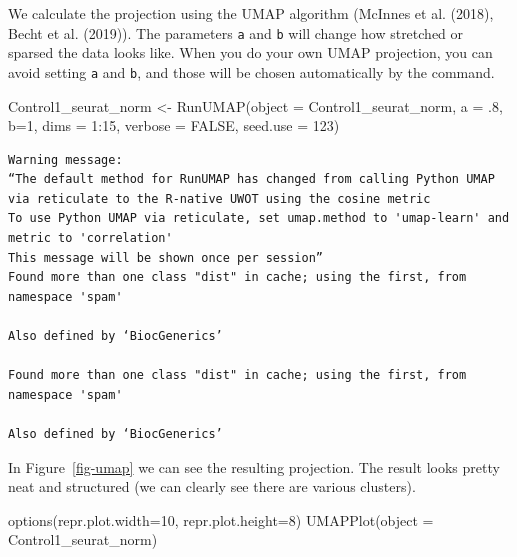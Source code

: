\documentclass[
  letterpaper,
  DIV=11,
  numbers=noendperiod]{scrartcl}
\newenvironment{Shaded}{\begin{snugshade}}{\end{snugshade}}
\newcommand{\AttributeTok}[1]{\textcolor[rgb]{0.49,0.56,0.16}{#1}}
\newcommand{\ConstantTok}[1]{\textcolor[rgb]{0.53,0.00,0.00}{#1}}
\newcommand{\DecValTok}[1]{\textcolor[rgb]{0.25,0.63,0.44}{#1}}
\newcommand{\FunctionTok}[1]{\textcolor[rgb]{0.02,0.16,0.49}{#1}}
\newcommand{\NormalTok}[1]{\textcolor[rgb]{0.00,0.44,0.13}{#1}}
\newcommand{\OtherTok}[1]{\textcolor[rgb]{0.00,0.44,0.13}{#1}}
\newcommand{\SpecialCharTok}[1]{\textcolor[rgb]{0.25,0.44,0.63}{#1}}
\begin{document}
We calculate the projection using the UMAP algorithm (McInnes et al.
(2018), Becht et al. (2019)). The parameters \texttt{a} and \texttt{b}
will change how stretched or sparsed the data looks like. When you do
your own UMAP projection, you can avoid setting \texttt{a} and
\texttt{b}, and those will be chosen automatically by the command.

\begin{Shaded}
\begin{Highlighting}[]
\NormalTok{Control1\_seurat\_norm }\OtherTok{\textless{}{-}} \FunctionTok{RunUMAP}\NormalTok{(}\AttributeTok{object =}\NormalTok{ Control1\_seurat\_norm, }
                                         \AttributeTok{a =}\NormalTok{ .}\DecValTok{8}\NormalTok{, }\AttributeTok{b=}\DecValTok{1}\NormalTok{,}
                                         \AttributeTok{dims =} \DecValTok{1}\SpecialCharTok{:}\DecValTok{15}\NormalTok{, }
                                         \AttributeTok{verbose =} \ConstantTok{FALSE}\NormalTok{, }
                                         \AttributeTok{seed.use =} \DecValTok{123}\NormalTok{)}
\end{Highlighting}
\end{Shaded}

\begin{verbatim}
Warning message:
“The default method for RunUMAP has changed from calling Python UMAP via reticulate to the R-native UWOT using the cosine metric
To use Python UMAP via reticulate, set umap.method to 'umap-learn' and metric to 'correlation'
This message will be shown once per session”
Found more than one class "dist" in cache; using the first, from namespace 'spam'

Also defined by ‘BiocGenerics’

Found more than one class "dist" in cache; using the first, from namespace 'spam'

Also defined by ‘BiocGenerics’
\end{verbatim}

In Figure~\ref{fig-umap} we can see the resulting projection. The result
looks pretty neat and structured (we can clearly see there are various
clusters).

\begin{Shaded}
\begin{Highlighting}[]
\FunctionTok{options}\NormalTok{(}\AttributeTok{repr.plot.width=}\DecValTok{10}\NormalTok{, }\AttributeTok{repr.plot.height=}\DecValTok{8}\NormalTok{)}
\FunctionTok{UMAPPlot}\NormalTok{(}\AttributeTok{object =}\NormalTok{ Control1\_seurat\_norm)}
\end{Highlighting}
\end{Shaded}
\end{document}
